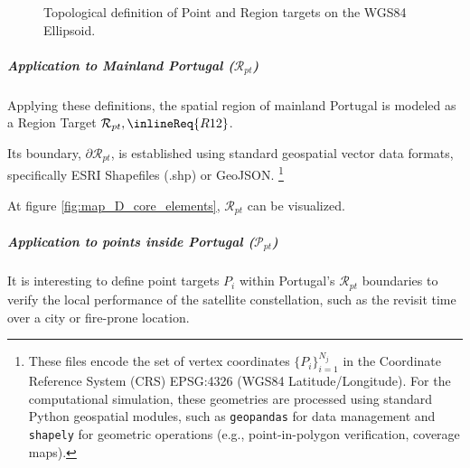 \begin{figure}[ht]

  \centering


  \caption{Topological definition of Point and Region targets on the WGS84 Ellipsoid.}

  \label{fig:drawing_core_spatial_elements}

\end{figure}



\subparagraph{Application to Mainland Portugal ($\mathcal{R}_{pt}$)}\hspace{0pt}



Applying these definitions, the spatial region of mainland Portugal is modeled as a Region Target $\mathcal{R}_{pt}, \inlineReq{R12}$. 

Its boundary, $\partial \mathcal{R}_{pt}$, is established using standard geospatial vector data formats, specifically ESRI Shapefiles (.shp) or GeoJSON. \footnote{These files encode the set of vertex coordinates $\{P_{i}\}_{i=1}^{N_j}$ in the Coordinate Reference System (CRS) EPSG:4326 (WGS84 Latitude/Longitude). For the computational simulation, these geometries are processed using standard Python geospatial modules, such as \texttt{geopandas} for data management and \texttt{shapely} for geometric operations (e.g., point-in-polygon verification, coverage maps).}

At figure \ref{fig:map_D_core_elements}, $\mathcal{R}_{pt}$ can be visualized.





\subparagraph{Application to points inside Portugal ($\mathcal{P}_{pt}$)}\hspace{0pt}

 

It is interesting to define point targets $P_i$ within Portugal's $\mathcal{R}_{pt}$ boundaries to verify the local performance of the satellite constellation, such as the revisit time over a city or fire-prone location. 

